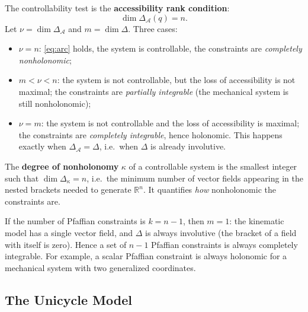 The controllability test is the \textbf{accessibility rank condition}:
\begin{equation}
\label{eq:arc}
    \dim \Delta_{\mathcal{A}}(q) = n.
\end{equation}
Let \( \nu = \dim \Delta_{\mathcal{A}} \) and \( m = \dim \Delta \).
Three cases:
\begin{itemize}
    \item \( \nu = n \): \cref{eq:arc} holds, the system is
          controllable, the constraints are \emph{completely
          nonholonomic};
    \item \( m < \nu < n \): the system is not controllable, but the
          loss of accessibility is not maximal; the constraints are
          \emph{partially integrable} (the mechanical system is still
          nonholonomic);
    \item \( \nu = m \): the system is not controllable and the loss of
          accessibility is maximal; the constraints are \emph{completely
          integrable}, hence holonomic. This happens exactly when
          \( \Delta_{\mathcal{A}} = \Delta \), i.e.\ when \( \Delta \)
          is already involutive.
\end{itemize}

The \textbf{degree of nonholonomy} \( \kappa \) of a controllable
system is the smallest integer such that \( \dim \Delta_\kappa = n \),
i.e.\ the minimum number of vector fields appearing in the nested
brackets needed to generate \( \mathbb{R}^n \). It quantifies \emph{how}
nonholonomic the constraints are.

\begin{nb}
If the number of Pfaffian constraints is \( k = n - 1 \), then
\( m = 1 \): the kinematic model has a single vector field, and
\( \Delta \) is always involutive (the bracket of a field with itself
is zero). Hence a set of \( n-1 \) Pfaffian constraints is always
completely integrable. For example, a scalar Pfaffian constraint is
always holonomic for a mechanical system with two generalized
coordinates.
\end{nb}

\subsection{The Unicycle Model}
\label{subsec:unicycle-model}

